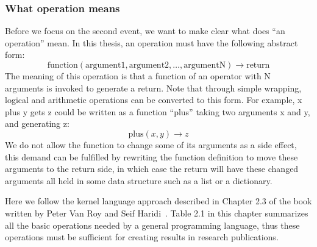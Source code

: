 \subsubsection{What operation means}
Before we focus on the second event, we want to make clear what does ``an operation'' mean. In this thesis, an operation must have the following abstract form:
\begin{equation}
\label{eq:fun}
\textrm{function}(\textrm{argument1}, \textrm{argument2}, \dots, \textrm{argumentN})\rightarrow \textrm{return}
\end{equation}
The meaning of this operation is that a function of an operator with N arguments is invoked to generate a return. Note that through simple wrapping, logical and arithmetic operations can be converted to this form. For example, x plus y gets z could be written as a function ``plus'' taking two arguments x and y, and generating z:
\begin{equation}
\textrm{plus}(x, y)\rightarrow z
\end{equation}
We do not allow the function to change some of its arguments as a side effect, this demand can be fulfilled by rewriting the function definition to move these arguments to the return side, in which case the return will have these changed arguments all held in some data structure such as a list or a dictionary.

Here we follow the kernel language approach described in Chapter 2.3 of the book written by Peter Van Roy and Seif Haridi~\cite{van2004concepts}. Table 2.1 in this chapter summarizes all the basic operations needed by a general programming language, thus these operations must be sufficient for creating results in research publications.

